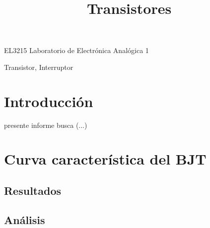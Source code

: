 \documentclass[journal]{IEEEtran}
\begin{document}
%
\title{Transistores}


%
{EL3215 Laboratorio de Electrónica Analógica 1}


\maketitle


\begin{abstract}

\end{abstract}

\begin{IEEEkeywords}
Transistor, Interruptor
\end{IEEEkeywords}


\section{Introducción}

 presente informe busca	(...)



\section{Curva característica del BJT}
\subsection{Resultados}
\subsection{Análisis}
\end{document}
